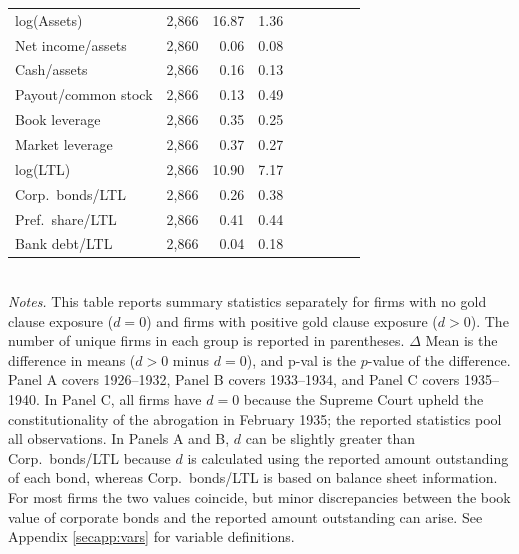 \begin{table}[p]
\begin{threeparttable}
\begin{tabular}{l rrr rrr rr}
            log(Assets) & 2,866 & 16.87 & 1.36 &  &  &  &  &  \\
            Net income/assets & 2,860 & 0.06 & 0.08 &  &  &  &  &  \\
            Cash/assets & 2,866 & 0.16 & 0.13 &  &  &  &  &  \\
            Payout/common stock & 2,866 & 0.13 & 0.49 &  &  &  &  &  \\
            Book leverage & 2,866 & 0.35 & 0.25 &  &  &  &  &  \\
            Market leverage & 2,866 & 0.37 & 0.27 &  &  &  &  &  \\
            log(LTL) & 2,866 & 10.90 & 7.17 &  &  &  &  &  \\
            Corp.\ bonds/LTL & 2,866 & 0.26 & 0.38 &  &  &  &  &  \\
            Pref.\ share/LTL & 2,866 & 0.41 & 0.44 &  &  &  &  &  \\
            Bank debt/LTL & 2,866 & 0.04 & 0.18 &  &  &  &  &  \\
            \bottomrule
        \end{tabular}
    \end{threeparttable}\\
    
    \vspace*{3mm} \justifying \noindent
    \scriptsize{\textit{Notes.} This table reports summary statistics separately for firms with no gold clause exposure ($d = 0$) and firms with positive gold clause exposure ($d > 0$). The number of unique firms in each group is reported in parentheses. $\Delta$ Mean is the difference in means ($d > 0$ minus $d = 0$), and p-val is the $p$-value of the difference. Panel A covers 1926--1932, Panel B covers 1933--1934, and Panel C covers 1935--1940. In Panel C, all firms have $d = 0$ because the Supreme Court upheld the constitutionality of the abrogation in February 1935; the reported statistics pool all observations. In Panels A and B, $d$ can be slightly greater than Corp.\ bonds/LTL because $d$ is calculated using the reported amount outstanding of each bond, whereas Corp.\ bonds/LTL is based on balance sheet information. For most firms the two values coincide, but minor discrepancies between the book value of corporate bonds and the reported amount outstanding can arise. See Appendix \ref{secapp:vars} for variable definitions.}
\end{table}
